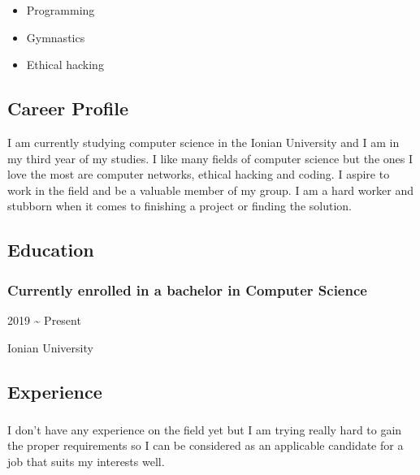 \documentclass[english,]{article}
\providecommand{\tightlist}{%
  \setlength{\itemsep}{0pt}\setlength{\parskip}{0pt}}
\begin{document}
\begin{itemize}
\tightlist
\item
  Programming
\item
  Gymnastics
\item
  Ethical hacking
\end{itemize}

\hypertarget{career-profile}{%
\subsection{\texorpdfstring{{ \emph{} \emph{} } Career
Profile}{    Career Profile}}\label{career-profile}}

I am currently studying computer science in the Ionian University and I
am in my third year of my studies. I like many fields of computer
science but the ones I love the most are computer networks, ethical
hacking and coding. I aspire to work in the field and be a valuable
member of my group. I am a hard worker and stubborn when it comes to
finishing a project or finding the solution.

\hypertarget{education}{%
\subsection{\texorpdfstring{{ \emph{} \emph{} }
Education}{    Education}}\label{education}}

\hypertarget{currently-enrolled-in-a-bachelor-in-computer-science}{%
\subsubsection{Currently enrolled in a bachelor in Computer
Science}\label{currently-enrolled-in-a-bachelor-in-computer-science}}

2019 \textasciitilde{} Present

Ionian University

\hypertarget{experience}{%
\subsection{\texorpdfstring{{ \emph{} \emph{} }
Experience}{    Experience}}\label{experience}}

\hypertarget{section}{%
\subsubsection{}\label{section}}

I don't have any experience on the field yet but I am trying really hard
to gain the proper requirements so I can be considered as an applicable
candidate for a job that suits my interests well.
\end{document}
